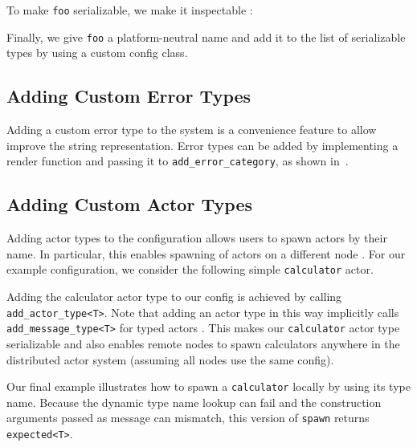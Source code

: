 To make \lstinline^foo^ serializable, we make it inspectable :



Finally, we give \lstinline^foo^ a platform-neutral name and add it to the list of serializable types by using a custom config class.



\subsection{Adding Custom Error Types}

Adding a custom error type to the system is a convenience feature to allow improve the string representation. Error types can be added by implementing a render function and passing it to \lstinline^add_error_category^, as shown in~.

\clearpage
\subsection{Adding Custom Actor Types \experimental}
\label{add-custom-actor-type}

Adding actor types to the configuration allows users to spawn actors by their name. In particular, this enables spawning of actors on a different node . For our example configuration, we consider the following simple \lstinline^calculator^ actor.



Adding the calculator actor type to our config is achieved by calling \lstinline^add_actor_type<T>^. Note that adding an actor type in this way implicitly calls \lstinline^add_message_type<T>^ for typed actors . This makes our \lstinline^calculator^ actor type serializable and also enables remote nodes to spawn calculators anywhere in the distributed actor system (assuming all nodes use the same config).



Our final example illustrates how to spawn a \lstinline^calculator^ locally by using its type name. Because the dynamic type name lookup can fail and the construction arguments passed as message can mismatch, this version of \lstinline^spawn^ returns \lstinline^expected<T>^.

